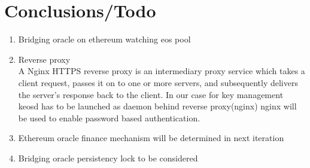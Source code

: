 \documentclass[]{article}
\begin{document}
\section{Conclusions/Todo}
\begin{enumerate}
		\item Bridging oracle on ethereum watching eos pool  
		\item Reverse proxy \\
		A Nginx HTTPS reverse proxy is an intermediary proxy service which takes a client request, passes it on to one or more servers, and subsequently delivers the server's response back to the client. 
		In our case for key management keosd has to be launched as daemon behind reverse proxy(nginx)
		nginx will be used to enable password based authentication.
		
		\item Ethereum oracle finance mechanism will be determined in next iteration
		\item Bridging oracle persistency lock to be considered
		
	
\end{enumerate}
\end{document}
